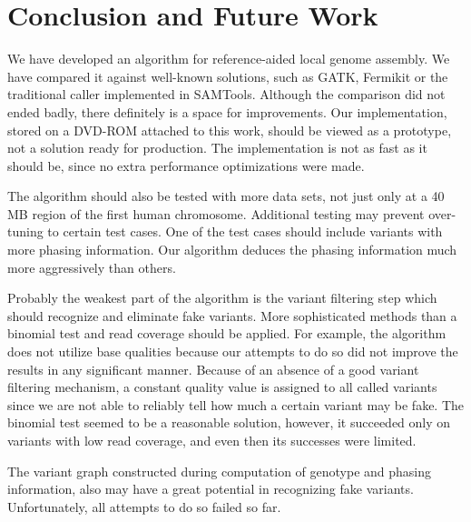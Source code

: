 \chapter{Conclusion and Future Work}
\label{chap:conclusion}

We have developed an algorithm for reference-aided local genome assembly. We have compared it against well-known solutions, such as GATK, Fermikit or the traditional caller implemented in SAMTools. Although the comparison did not ended badly, there definitely is a space for improvements. Our implementation, stored on a DVD-ROM attached to this work, should be viewed as a prototype, not a solution ready for production. The implementation is not as fast as it should be, since no extra performance optimizations were made.

The algorithm should also be tested with more data sets, not just only at a 40 MB region of the first human chromosome. Additional testing may prevent over-tuning to certain test cases. One of the test cases should include variants with more phasing information. Our algorithm deduces the phasing information much more aggressively than others.

Probably the weakest part of the algorithm is the variant filtering step which should recognize and eliminate fake variants. More sophisticated methods than a binomial test and read coverage should be applied. For example, the algorithm does not utilize base qualities because our attempts to do so did not improve the results in any significant manner. Because of an absence of a good variant filtering mechanism, a constant quality value is assigned to all called variants since we are not able to reliably tell how much a certain variant may be fake. The binomial test seemed to be a reasonable solution, however, it succeeded only on variants with low read coverage, and even then its successes were limited.

The variant graph constructed during computation of genotype and phasing information, also may have a great potential in recognizing fake variants. Unfortunately, all attempts to do so failed so far.